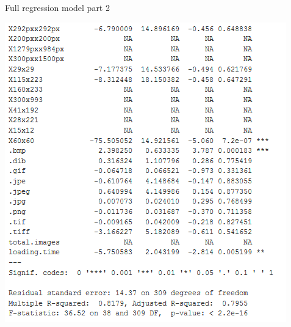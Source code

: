 \documentclass{article}
\begin{document}
\begin{table}[H]
\centering
\caption{Full regression model part 2}\label{d :r :1b}
\begin{center}
\includegraphics[scale=0.8]{../R/photos/66_FULL_PART2.PNG}  \\
\end{center}
\end{table}
\end{document}
